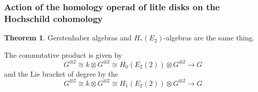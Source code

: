 \documentclass{beamer}
\theoremstyle{definition}
\newtheorem{teorema}{Theorem}
\newcommand{\CC}{\mathcal{C}}
\begin{document}
%	
%

\begin{frame}
	\frametitle{Action of the homology operad of litle disks on the Hochschild cohomology}
	
	\begin{teorema}
		Gerstenhaber algebras and $H_*(E_2)$-algebras are the same thing.
	\end{teorema}\pause 
The commutative product is given by 
\[
G^{\otimes 2}\cong k\otimes G^{\otimes 2}\cong H_0(E_2(2))\otimes G^{\otimes 2}\to G
\]
\pause
and the Lie bracket of degree by the
\[
G^{\otimes 2}\cong k\otimes G^{\otimes 2}\cong H_1(E_2(2))\otimes G^{\otimes 2}\to G
\]
	\end{frame}
\end{document}
